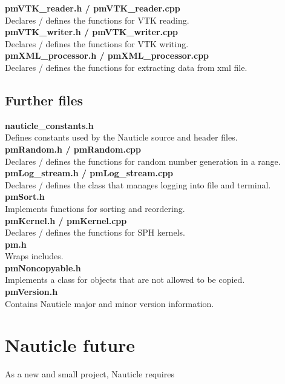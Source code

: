 \documentclass[a4paper,12pt,openany]{book}
\theoremstyle{break}
\begin{document}
\textbf{pmVTK\_reader.h / pmVTK\_reader.cpp} \\
Declares / defines the functions for VTK reading. \\

\textbf{pmVTK\_writer.h / pmVTK\_writer.cpp} \\
Declares / defines the functions for VTK writing. \\

\textbf{pmXML\_processor.h / pmXML\_processor.cpp} \\
Declares / defines the functions for extracting data from xml file. \\

\subsection{Further files}
\textbf{nauticle\_constants.h} \\
Defines constants used by the Nauticle source and header files. \\

\textbf{pmRandom.h / pmRandom.cpp} \\
Declares / defines the functions for random number generation in a range. \\

\textbf{pmLog\_stream.h / pmLog\_stream.cpp} \\
Declares / defines the class that manages logging into file and terminal. \\

\textbf{pmSort.h}\\
Implements functions for sorting and reordering.\\

\textbf{pmKernel.h / pmKernel.cpp} \\
Declares / defines the functions for SPH kernels.\\

\textbf{pm.h}\\
Wraps includes.\\

\textbf{pmNoncopyable.h}\\
Implements a class for objects that are not allowed to be copied.\\

\textbf{pmVersion.h}\\
Contains Nauticle major and minor version information.\\

\section{Nauticle future}
As a new and small project, Nauticle requires 
\end{document}
